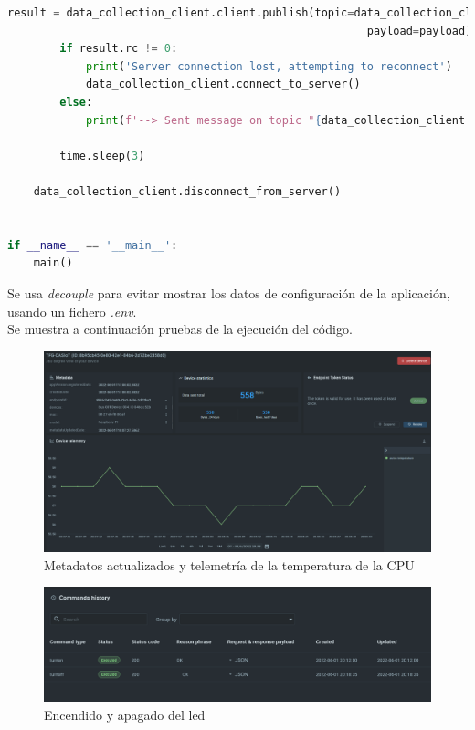 \begin{lstlisting}[language=Python]
        result = data_collection_client.client.publish(topic=data_collection_client.data_collection_topic,
                                                       payload=payload)
        if result.rc != 0:
            print('Server connection lost, attempting to reconnect')
            data_collection_client.connect_to_server()
        else:
            print(f'--> Sent message on topic "{data_collection_client.data_collection_topic}":\n{payload}')

        time.sleep(3)

    data_collection_client.disconnect_from_server()


if __name__ == '__main__':
    main()


\end{lstlisting}

Se usa \textit{decouple} para evitar mostrar los datos de configuración de la aplicación, usando un fichero \textit{.env}. \\

Se muestra a continuación pruebas de la ejecución del código.


\begin{figure}[p]
    \centering
    \includegraphics[width=\linewidth]{imagenes/data-execution.png}
    \caption{Metadatos actualizados y telemetría de la temperatura de la CPU}
    \label{fig:figure13}
\end{figure}

\begin{figure}[p]
    \centering
    \includegraphics[width=\linewidth]{imagenes/command-execution.png}
    \caption{Encendido y apagado del led}
    \label{fig:figure14}
\end{figure}

